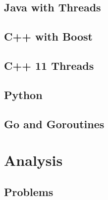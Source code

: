 \documentclass[11pt]{article} %
\begin{document}


\subsection{Java with Threads}
\subsection{C++ with Boost}
\subsection{C++ 11 Threads}
\subsection{Python}
\subsection{Go and Goroutines}


\section{Analysis}
\subsection{Problems}
\end{document}
